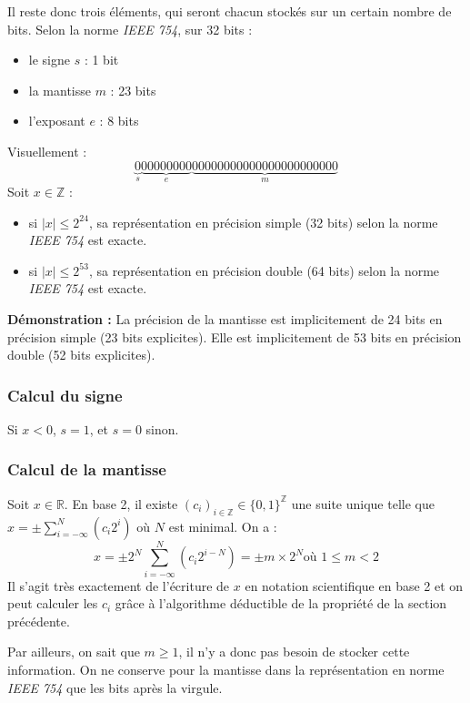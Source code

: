 \documentclass[../../main.tex]{subfiles}
\begin{document}
Il reste donc trois éléments, qui seront chacun stockés sur un certain nombre de bits. \newline
Selon la norme \textit{IEEE 754}, sur 32 bits :
\begin{itemize}
     \item le signe $s$ : 1 bit
     \item la mantisse $m$ : 23 bits
     \item l'exposant $e$ : 8 bits
\end{itemize}
Visuellement :
$$\underbrace{0}_{s}\underbrace{00000000}_{e}\underbrace{00000000000000000000000}_{m}$$
 Soit $x\in\mathbb{Z}$ : 
\begin{itemize}
  \item si $|x| \leq 2^{24}$, sa représentation en précision simple (32 bits) selon la norme \textit{IEEE 754} est exacte.
  \item si $|x| \leq 2^{53}$, sa représentation en précision double (64 bits) selon la norme \textit{IEEE 754} est exacte.
\end{itemize}
\textbf{Démonstration :} La précision de la mantisse est implicitement de 24 bits en précision simple (23 bits explicites). Elle est implicitement de 53 bits en précision double (52 bits explicites).
\subsubsection{Calcul du signe} \label{ssub:calcul_du_signe}
Si $x < 0$, $s = 1$, et $s= 0$ sinon.
\subsubsection{Calcul de la mantisse} \label{ssub:calcul_de_la_mantisse}
Soit $x\in{\mathbb{R}}$.\newline
En base 2, il existe $(c_{i})_{i\in{\mathbb{Z}}}\in{\{0, 1\}^{\mathbb{Z}}}$ une suite unique telle que $x = \pm \displaystyle\sum_{i = -\infty}^{N}\left(c_{i}2^{i}\right)$ où $N$ est minimal.\newline
On a :
$$x = \pm 2^{N}\displaystyle\sum_{i = -\infty}^{N}\left(c_{i}2^{i-N}\right) = \pm m\times{2^{N}}\text{où $1 \leq m < 2$}$$
Il s'agit très exactement de l'écriture de $x$ en notation scientifique en base 2 et on peut calculer les $c_{i}$ grâce à l'algorithme déductible de la propriété de la section précédente.

Par ailleurs, on sait que $m\geq{1}$, il n'y a donc pas besoin de stocker cette information. On ne conserve pour la mantisse dans la représentation en norme \textit{IEEE 754} que les bits après la virgule.
\end{document}

